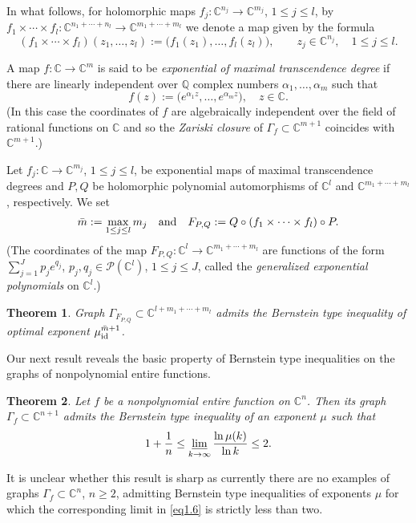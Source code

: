 \documentclass[11pt, oneside]{amsart}
\newtheorem{Th}{Theorem}[section]
\begin{document}
In what follows, for holomorphic maps $f_j:\mathbb C^{n_j}\rightarrow \mathbb C^{m_j}$, $1\le j\le l$, by
$f_1\times\cdots\times f_l:\mathbb C^{n_1+\cdots + n_l}\rightarrow\mathbb C^{m_1+\cdots +m _l}$ we denote a map given by the formula
\begin{equation}\label{product}
(f_1\times\cdots\times f_l)(z_1,\dots, z_l):=\bigl(f_1(z_1),\dots, f_l(z_l)\bigr),\qquad z_j\in\mathbb C^{n_j},\quad 1\le j\le l.
\end{equation}

A map $f:\mathbb C\rightarrow\mathbb C^m$ is said to be {\em exponential of maximal transcendence degree} if there are
linearly independent over $\mathbb Q$ complex numbers $\alpha_1,\dots, \alpha_m$ such that\begin{equation}\label{expo}
f(z):=\bigl(e^{\alpha_1 z},\dots, e^{\alpha_m z}\bigr),\quad z\in\mathbb C.
\end{equation}
(In this case the coordinates of $f$ are algebraically independent over the field of rational functions on $\mathbb C$ and so the {\em Zariski closure} of $\Gamma_f\subset\mathbb C^{m+1}$ coincides with $\mathbb C^{m+1}$.)

Let $f_j:\mathbb C\rightarrow\mathbb C^{m_j}$, $1\le j\le l$, be exponential maps of maximal transcendence degrees and $P,Q$ be holomorphic polynomial automorphisms of $\mathbb C^l$  and $\mathbb C^{m_1+\cdots +m_l}$, respectively. We set 
\begin{equation}\label{compos}
\bar m:=\max_{1\le j\le l} m_j\quad {\rm and}\quad F_{P,Q}:=Q\circ (f_1\times\cdots\times f_l)\circ P.
\end{equation}
(The coordinates of the map $F_{P,Q}:\mathbb C^l\rightarrow\mathbb C^{m_1+\cdots +m_l}$ are functions of the form $\sum_{j=1}^J p_j e^{q_j}$, $p_j,q_j\in\mathcal P(\mathbb C^l)$, $1\le j\le J$, called the {\em generalized exponential polynomials} on $\mathbb C^l$.)
\begin{Th}\label{theo1.4}
Graph $\Gamma_{F_{P,Q}}\subset\mathbb C^{l+m_1+\cdots + m_l}$ admits the Bernstein type inequality of optimal exponent $\mu_{{\rm id}}^{\bar m+1}$.
\end{Th}

Our next result reveals the basic property of Bernstein type inequalities on the graphs of nonpolynomial entire functions.
\begin{Th}\label{theo1.5}
Let $f$ be a nonpolynomial entire function on $\mathbb C^n$. Then its graph $\Gamma_f\subset\mathbb C^{n+1}$ admits the Bernstein type inequality of an exponent $\mu$  such that
\begin{equation}\label{eq1.6}
1+\frac 1n \le\varliminf_{k\rightarrow\infty}\frac{\ln\mu(k)}{\ln k}\le 2.
\end{equation}
\end{Th}
It is unclear whether this result is sharp as currently there are no examples of graphs $\Gamma_f\subset\mathbb C^n$, $n\ge 2$, admitting Bernstein type inequalities of exponents $\mu$ for which the corresponding limit in \eqref{eq1.6} is strictly less than two.\smallskip
\end{document}
